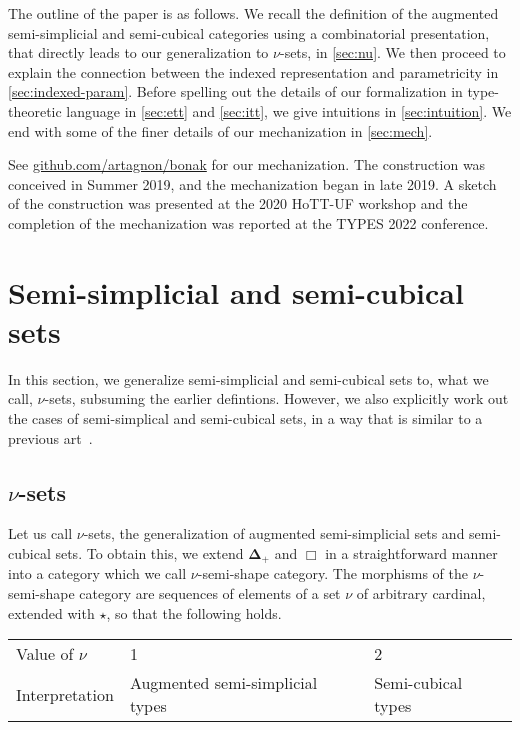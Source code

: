 \documentclass{msc}
\newcommand{\DeltaPlus}{\ensuremath{\boldsymbol{\Delta}_+}}
\newcommand{\Cube}{\ensuremath{\boldsymbol{{\Box}}}}
\newcommand{\kstar}{{\star}}
\def\graymidrule{\arrayrulecolor{gray30}\midrule\arrayrulecolor{gray65}}
\begin{document}
The outline of the paper is as follows. We recall the definition of the augmented semi-simplicial and semi-cubical categories using a combinatorial presentation, that directly leads to our generalization to $\nu$-sets, in \ref{sec:nu}. We then proceed to explain the connection between the indexed representation and parametricity in \ref{sec:indexed-param}. Before spelling out the details of our formalization in type-theoretic language in \ref{sec:ett} and \ref{sec:itt}, we give intuitions in \ref{sec:intuition}. We end with some of the finer details of our mechanization in \ref{sec:mech}.

See \href{https://github.com/artagnon/bonak}{github.com/artagnon/bonak} for our mechanization. The construction was conceived in Summer 2019, and the mechanization began in late 2019. A sketch of the construction was presented at the 2020 HoTT-UF workshop and the completion of the mechanization was reported at the TYPES 2022 conference.

\section{Semi-simplicial and semi-cubical sets\label{sec:nu}}
In this section, we generalize semi-simplicial and semi-cubical sets to, what we call, $\nu$-sets, subsuming the earlier defintions. However, we also explicitly work out the cases of semi-simplical and semi-cubical sets, in a way that is similar to a previous art~\cite{aitchison86}.

\subsection{\texorpdfstring{$\nu$}{ν}-sets}
Let us call $\nu$-sets, the generalization of augmented semi-simplicial sets and semi-cubical sets. To obtain this, we extend $\DeltaPlus$ and $\Cube$ in a straightforward manner into a category which we call $\nu$-semi-shape category. The morphisms of the $\nu$-semi-shape category are sequences of elements of a set $\nu$ of arbitrary cardinal, extended with $\kstar$, so that the following holds.

\begin{table}[H]
  \centering
  \begin{tabularx}{0.95\linewidth}{X|X|X}
    \toprule
    Value of $\nu$ & 1                               & 2                  \\
    \graymidrule
    Interpretation & Augmented semi-simplicial types & Semi-cubical types \\
    \bottomrule
  \end{tabularx}
\end{table}
\end{document}
